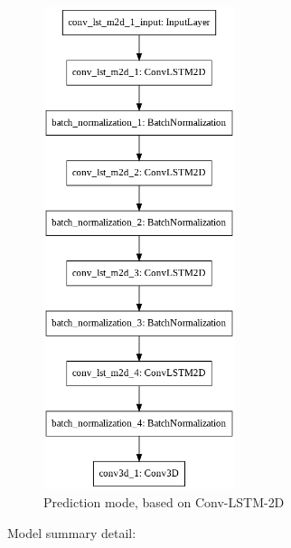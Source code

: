 \begin{figure}[h!]
	\centering
	\includegraphics[width=0.5\textwidth]{figures/time_model.png}
	\caption{Prediction mode, based on Conv-LSTM-2D}
	\label{fig:timeModel}
\end{figure}

Model summary detail:

